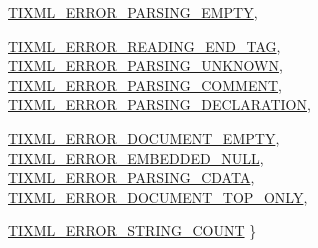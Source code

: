 \begin{DoxyCompactItemize}
\hyperlink{classTiXmlBase_a9a7e9344415956ab96e8c75f6a0bbd48a5f2aee664733a20f13f6f77556b9fa85}{TIXML\_\-ERROR\_\-PARSING\_\-EMPTY}, 
\par
\hyperlink{classTiXmlBase_a9a7e9344415956ab96e8c75f6a0bbd48a175f7c72e2f9630bb96ef5137b325502}{TIXML\_\-ERROR\_\-READING\_\-END\_\-TAG}, 
\hyperlink{classTiXmlBase_a9a7e9344415956ab96e8c75f6a0bbd48a24c814fdcf1d84704869e6f76b19cb6e}{TIXML\_\-ERROR\_\-PARSING\_\-UNKNOWN}, 
\hyperlink{classTiXmlBase_a9a7e9344415956ab96e8c75f6a0bbd48a72e3072a44be499edb89593f6ce10f6c}{TIXML\_\-ERROR\_\-PARSING\_\-COMMENT}, 
\hyperlink{classTiXmlBase_a9a7e9344415956ab96e8c75f6a0bbd48a4c200f9d125027ab449e2be7be471ba0}{TIXML\_\-ERROR\_\-PARSING\_\-DECLARATION}, 
\par
\hyperlink{classTiXmlBase_a9a7e9344415956ab96e8c75f6a0bbd48ab345f3e42e6ae9cdedee2b95e4d461b9}{TIXML\_\-ERROR\_\-DOCUMENT\_\-EMPTY}, 
\hyperlink{classTiXmlBase_a9a7e9344415956ab96e8c75f6a0bbd48ade7edbad3a94a6c161cac2638f380e17}{TIXML\_\-ERROR\_\-EMBEDDED\_\-NULL}, 
\hyperlink{classTiXmlBase_a9a7e9344415956ab96e8c75f6a0bbd48aab2c858631b5d38eae1e6675949b9cd4}{TIXML\_\-ERROR\_\-PARSING\_\-CDATA}, 
\hyperlink{classTiXmlBase_a9a7e9344415956ab96e8c75f6a0bbd48a679b15d950f29257700a724bb118c34d}{TIXML\_\-ERROR\_\-DOCUMENT\_\-TOP\_\-ONLY}, 
\par
\hyperlink{classTiXmlBase_a9a7e9344415956ab96e8c75f6a0bbd48a14552894942250efcec6b00dc52fc48a}{TIXML\_\-ERROR\_\-STRING\_\-COUNT}
 \}
\end{DoxyCompactItemize}
